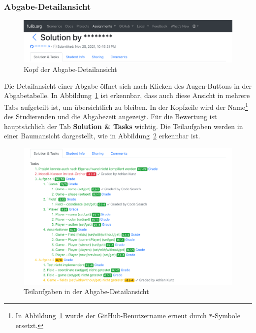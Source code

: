\subsubsection{Abgabe-Detailansicht}

\begin{figure}
    \centering
    \includegraphics[width=\textwidth]{images/solution-head}
    \caption{Kopf der Abgabe-Detailansicht}
    \label{fig:solution-head}
\end{figure}


Die Detailansicht einer Abgabe öffnet sich nach Klicken des Augen-Buttons in der Abgabetabelle.
In Abbildung~\ref{fig:solution-head} ist erkennbar, dass auch diese Ansicht in mehrere Tabs aufgeteilt ist, um übersichtlich zu bleiben.
In der Kopfzeile wird der Name\footnote{
    In Abbildung~\ref{fig:solution-head} wurde der GitHub-Benutzername erneut durch \texttt{*}-Symbole ersetzt.
} des Studierenden und die Abgabezeit angezeigt.
Für die Bewertung ist hauptsächlich der Tab \textbf{Solution \& Tasks} wichtig.
Die Teilaufgaben werden in einer Baumansicht dargestellt, wie in Abbildung~\ref{fig:solution-tasks} erkennbar ist.

\begin{figure}
    \centering
    \includegraphics[width=\textwidth]{images/solution-tasks}
    \caption{Teilaufgaben in der Abgabe-Detailansicht}
    \label{fig:solution-tasks}
\end{figure}

